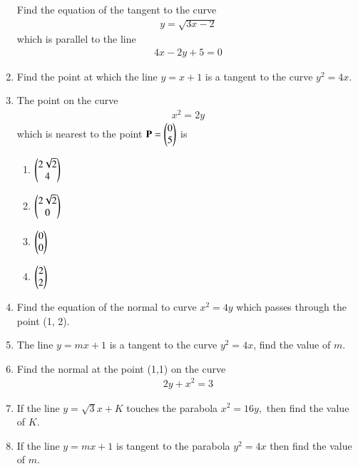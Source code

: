 \begin{enumerate}[label=\thesubsection.\arabic*,ref=\thesubsection.\theenumi]
Find the equation of the tangent to the curve 
\begin{align}
	y = \sqrt{3x-2}
\end{align}
which is parallel to the line
\begin{align}
	4x-2y+5 = 0
\end{align}
\solution 
\label{chapters/12/6/3/25}

\item 
Find the point at which the line $y = x + 1$ is a tangent to the curve $y^2 = 4x$.
\\
\solution 
\label{chapters/12/6/3/27}

    \item The point on the curve 
\label{chapters/12/6/5/27}
    \begin{align}
        x^2 = 2y
        \label{eq:chapters/12/6/5/27/curve}
    \end{align}
    which is nearest to the point 
    $\mathbf{P} = \begin{pmatrix}0\\5\end{pmatrix}$ is
    \begin{enumerate}
        \item $\begin{pmatrix}2\sqrt{2}\\4\end{pmatrix}$
        \item $\begin{pmatrix}2\sqrt{2}\\0\end{pmatrix}$
        \item $\begin{pmatrix}0\\0\end{pmatrix}$
        \item $\begin{pmatrix}2\\2\end{pmatrix}$
    \end{enumerate}
    \solution 

\item 
Find the equation of the normal to curve $x^2 = 4y$ which passes through the point
(1, 2).
\\
\solution 
\label{chapters/12/6/6/4}

\item 
 The line $y=mx+1$ is a tangent to the curve $y^2 = 4x$, find the value of $m$. 
 \\
 \solution 
\label{chapters/12/6/6/21}

\item 
\label{chapters/12/6/6/22}
Find the normal at the point (1,1) on the curve 
\begin{align}
2y+x^2=3
\end{align}
\solution

 \item If the line $y=\sqrt{3}x+K$ touches the parabola $x^2=16y,$ then find the value of $K$.
\item If the line $y=mx+1$ is tangent to the parabola $y^2=4x$ then find the value of $m$.

\end{enumerate}
